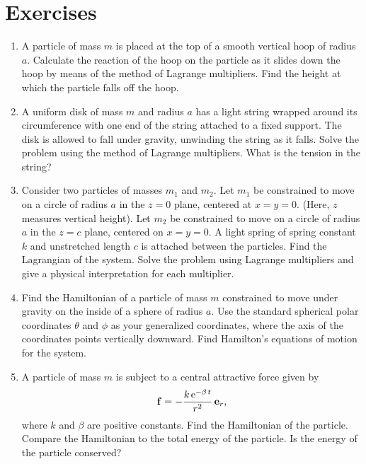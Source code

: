\section{Exercises}
{\small
\renewcommand{\theenumi}{10.\arabic{enumi}}
\begin{enumerate}
\item A particle of mass $m$ is placed at the top of
a smooth vertical hoop of radius $a$. Calculate the reaction of the hoop on the
particle as it slides down the hoop by means of the method of Lagrange multipliers. Find the height at which the particle falls off the hoop.
\item A uniform disk of mass $m$ and radius $a$ has a light string wrapped
around its circumference with one end of the string attached to a fixed
support. The disk is allowed to fall under gravity, unwinding the string
as it falls. Solve the problem using the method of Lagrange multipliers.
What is the tension in the string?
\item Consider two particles of masses $m_1$ and $m_2$. Let $m_1$
be constrained to move on a circle of radius $a$ in the $z=0$ plane,
centered at $x=y=0$. (Here, $z$ measures vertical height). Let $m_2$
be constrained to move on a circle of radius $a$ in the $z=c$ plane,
centered on $x=y=0$. A light  spring of spring constant $k$ and unstretched
length $c$
is attached between the particles. Find the Lagrangian of the system. Solve the
problem using Lagrange multipliers and give a physical interpretation
for each multiplier.

\item Find the Hamiltonian of a particle of mass $m$ constrained to
move under gravity on the inside of a sphere of radius $a$. 
Use the standard spherical polar coordinates $\theta$ and $\phi$ as
your generalized coordinates, where the axis of the coordinates points
vertically downward. Find Hamilton's equations of motion for the system.
\item A particle of mass $m$ is subject to a central attractive force
given by
$$
{\bf f} = - \frac{k\,{\rm e}^{-\beta\,t}}{r^2}\,{\bf e}_r,
$$
where $k$ and $\beta$ are positive constants. Find the Hamiltonian of
the particle. Compare the Hamiltonian to the total energy of the particle.
Is the energy of the particle conserved?
\end{enumerate}
}